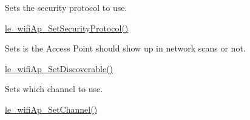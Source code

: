 Sets the security protocol to use.
\begin{DoxyItemize}
\item \hyperlink{le__wifi_ap__interface_8h_a0985bb7661b81c6882a170855c7c8298}{le\+\_\+wifi\+Ap\+\_\+\+Set\+Security\+Protocol()}
\end{DoxyItemize}

Sets is the Access Point should show up in network scans or not.
\begin{DoxyItemize}
\item \hyperlink{le__wifi_ap__interface_8h_a53d220d33f1c7d7560605b5bffc13c80}{le\+\_\+wifi\+Ap\+\_\+\+Set\+Discoverable()}
\end{DoxyItemize}

Sets which channel to use.
\begin{DoxyItemize}
\item \hyperlink{le__wifi_ap__interface_8h_a686036419f15a4253c28a41c6d2dc759}{le\+\_\+wifi\+Ap\+\_\+\+Set\+Channel()}
\end{DoxyItemize}


